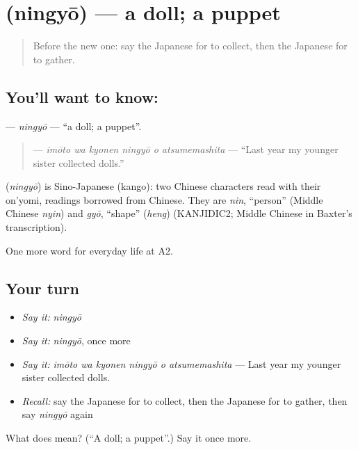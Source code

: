 \section[\texorpdfstring{\ja{にんぎょう} (ningyō)}{にんぎょう (ningyō)}]{ (ningyō) — a doll; a puppet}

\label{lesson:JA-C237-ningyou}



\begin{quote}
Before the new one: say the Japanese for to collect, then the Japanese for to gather.
\end{quote}

\subsection*{You'll want to know: }
\textbf{} — \emph{ningyō} — \textquotedblleft{}a doll; a puppet\textquotedblright{}.

\begin{quote}
\textbf{   } — \emph{imōto wa kyonen ningyō o atsumemashita} — \textquotedblleft{}Last year my younger sister collected dolls.\textquotedblright{}
\end{quote}

\begin{cousinweb}
\textbf{} (\emph{ningyō}) is Sino-Japanese (kango): two Chinese characters read with their on'yomi, readings borrowed from Chinese. They are \emph{nin}, \textquotedblleft{}person\textquotedblright{} (Middle Chinese \emph{nyin}) and \emph{gyō}, \textquotedblleft{}shape\textquotedblright{} (\emph{heng}) (KANJIDIC2; Middle Chinese in Baxter's transcription).
\end{cousinweb}

\begin{grammarlens}[title={What you've built}]
One more word for everyday life at A2.
\end{grammarlens}

\subsection*{Your turn}
\begin{itemize}
\raggedright
  \item \emph{Say it:} \emph{ningyō}
  \item \emph{Say it:} \emph{ningyō}, once more
  \item \emph{Say it:} \emph{imōto wa kyonen ningyō o atsumemashita} — Last year my younger sister collected dolls.
  \item \emph{Recall:} say the Japanese for to collect, then the Japanese for to gather, then say \emph{ningyō} again
\end{itemize}

\begin{tcolorbox}[breakable,colback=teal!4,colframe=teal!35!black,title={Before you move on}]
What does  mean? (\textquotedblleft{}A doll; a puppet\textquotedblright{}.) Say it once more.
\end{tcolorbox}
